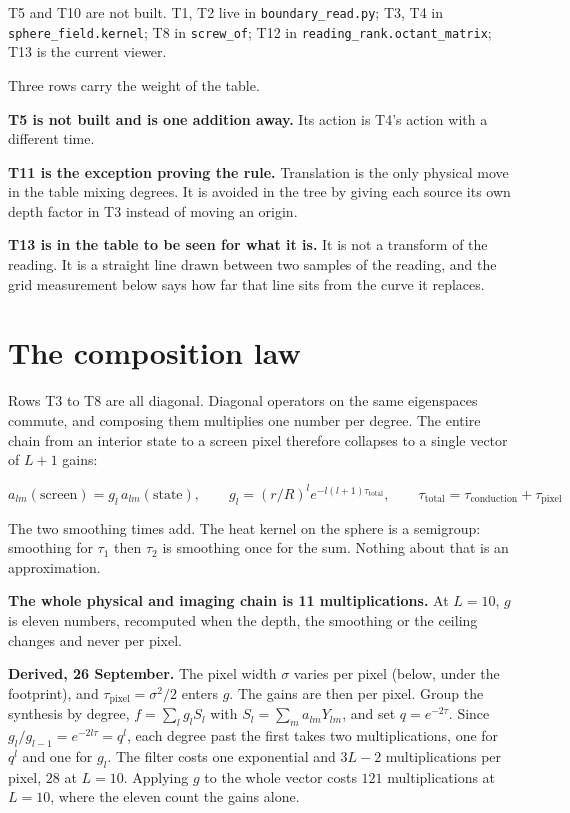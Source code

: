 T5 and T10 are not built. T1, T2 live in \texttt{boundary\_read.py}; T3, T4 in \texttt{sphere\_field.kernel}; T8 in \texttt{screw\_of}; T12 in \texttt{reading\_rank.octant\_matrix}; T13 is the current viewer.

Three rows carry the weight of the table.

\textbf{T5 is not built and is one addition away.} Its action is T4's action with a different time.

\textbf{T11 is the exception proving the rule.} Translation is the only physical move in the table mixing degrees. It is avoided in the tree by giving each source its own depth factor in T3 instead of moving an origin.

\textbf{T13 is in the table to be seen for what it is.} It is not a transform of the reading. It is a straight line drawn between two samples of the reading, and the grid measurement below says how far that line sits from the curve it replaces.

\section{The composition law}

Rows T3 to T8 are all diagonal. Diagonal operators on the same eigenspaces commute, and composing them multiplies one number per degree. The entire chain from an interior state to a screen pixel therefore collapses to a single vector of \(L+1\) gains:

\begin{center}
\(a_{lm}(\text{screen}) = g_l\, a_{lm}(\text{state}), \qquad g_l = (r/R)^l e^{-l(l+1)\tau_{\text{total}}}, \qquad \tau_{\text{total}} = \tau_{\text{conduction}} + \tau_{\text{pixel}}\)
\end{center}

The two smoothing times add. The heat kernel on the sphere is a semigroup: smoothing for \(\tau_1\) then \(\tau_2\) is smoothing once for the sum. Nothing about that is an approximation.

\textbf{The whole physical and imaging chain is 11 multiplications.} At \(L = 10\), \(g\) is eleven numbers, recomputed when the depth, the smoothing or the ceiling changes and never per pixel.

\textbf{Derived, 26 September.} The pixel width \(\sigma\) varies per pixel (below, under the footprint), and \(\tau_{\text{pixel}} = \sigma^2/2\) enters \(g\). The gains are then per pixel. Group the synthesis by degree, \(f = \sum_l g_l S_l\) with \(S_l = \sum_m a_{lm} Y_{lm}\), and set \(q = e^{-2\tau}\). Since \(g_l / g_{l-1} = e^{-2l\tau} = q^l\), each degree past the first takes two multiplications, one for \(q^l\) and one for \(g_l\). The filter costs one exponential and \(3L - 2\) multiplications per pixel, \(28\) at \(L = 10\). Applying \(g\) to the whole vector costs \(121\) multiplications at \(L = 10\), where the eleven count the gains alone.

